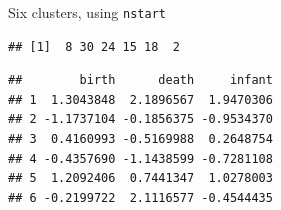 \begin{frame}[fragile]{Six clusters, using \texttt{nstart}}
  
\begin{knitrout}
\color{fgcolor}\begin{kframe}
\begin{alltt}
\hlkwb{=}\hlstd{(vital.s[}\hlopt{:}\hlstd{],}\hlstd{,}\hlstd{=}\hlstd{)}
\hlopt{$}
\end{alltt}
\begin{verbatim}
## [1]  8 30 24 15 18  2
\end{verbatim}
\begin{alltt}
\hlopt{$}
\end{alltt}
\begin{verbatim}
##        birth      death     infant
## 1  1.3043848  2.1896567  1.9470306
## 2 -1.1737104 -0.1856375 -0.9534370
## 3  0.4160993 -0.5169988  0.2648754
## 4 -0.4357690 -1.1438599 -0.7281108
## 5  1.2092406  0.7441347  1.0278003
## 6 -0.2199722  2.1116577 -0.4544435
\end{verbatim}
\begin{alltt}
\hlopt{$}\hlkwb{=}\hlopt{$}
\end{alltt}
\end{kframe}
\end{knitrout}
  
\end{frame}

